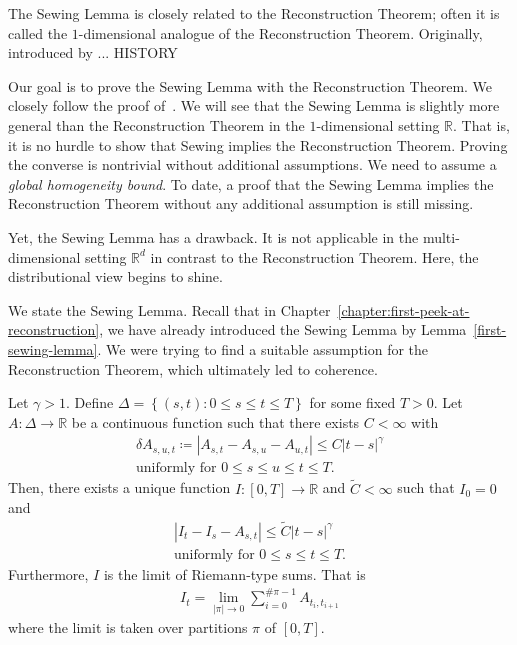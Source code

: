 The Sewing Lemma is closely related to the Reconstruction Theorem; often it is called the \( 1 \)-dimensional analogue of the Reconstruction Theorem. Originally, introduced by ... HISTORY

Our goal is to prove the Sewing Lemma with the Reconstruction Theorem. We closely follow the proof of~\cite[Chapter 5]{broux2021sewing}. We will see that the Sewing Lemma is slightly more general than the Reconstruction Theorem in the \( 1 \)-dimensional setting \( \mathbb{R} \). That is, it is no hurdle to show that Sewing implies the Reconstruction Theorem. Proving the converse is nontrivial without additional assumptions. We need to assume a \emph{global homogeneity bound}. To date, a proof that the Sewing Lemma implies the Reconstruction Theorem without any additional assumption is still missing. 

Yet, the Sewing Lemma has a drawback. It is not applicable in the multi-dimensional setting \( \mathbb{R}^d \) in contrast to the Reconstruction Theorem. Here, the distributional view begins to shine.

We state the Sewing Lemma. Recall that in Chapter~\ref{chapter:first-peek-at-reconstruction}, we have already introduced the Sewing Lemma by Lemma~\ref{first-sewing-lemma}. We were trying to find a suitable assumption for the Reconstruction Theorem, which ultimately led to coherence.

\begin{lemma}
  Let \(\gamma > 1\). Define \( \Delta = \left \{ (s,t) :  0 \leq s \leq t \leq T\right \} \) for some fixed \(T > 0\). Let \(A: \Delta \to \mathbb{R}\) be a continuous function such that there exists \( C <\infty \) with
  \begin{gather*}
      \delta A_{s,u,t} \coloneqq |A_{s,t} - A_{s,u} - A_{u,t}| \leq C  {|t-s|}^\gamma \\
      \text{uniformly for \(0 \leq s \leq u \leq t \leq T\)}. \nonumber
  \end{gather*} 
  Then, there exists a unique function \(I: [0,T] \to \mathbb{R}\) and \(\tilde C < {\infty}\)  such that \(I_0 = 0\) and 
  \begin{gather*}
      |I_t - I_s - A_{s,t}| \leq \tilde C|t-s|^\gamma \\
      \text{uniformly for \(0 \leq s \leq t \leq T\).}
  \end{gather*}  
  Furthermore, \(I\) is the limit of Riemann-type sums. That is 
  \begin{align*}
    I_t =  \lim\limits_{|\pi| \to 0} \sum\limits_{i=0}^{\# \pi - 1} A_{t_i,t_{i+1}}
  \end{align*}
  where the limit is taken over partitions \( \pi \) of \( [0,T] \).
\end{lemma}

